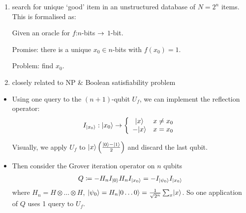 \documentclass[]{article}
\begin{document}
\begin{enumerate}[label=-]
	\item search for unique `good' item in an unstructured database of $N = 2^n$ items. This is formalised as:
	
	Given an oracle for $f$:$n$-bits $\rightarrow$ $1$-bit.

	Promise: there is a unique $x_0 \in n$-bits with $f(x_0) = 1$.

	Problem: find $x_0$.

	\item closely related to NP \& Boolean satisfiability problem
	
\end{enumerate}
\begin{itemize}
	\item Using one query to the $(n+1)$-qubit $U_f$, we can implement the reflection operator:
	\begin{align*}
		I_{\lvert x_0\rangle}:\lvert x_0\rangle \rightarrow \left\lbrace \begin{array}{cc} \lvert x\rangle & x\ne x_0 \\ -\lvert x\rangle & x = x_0 \end{array}\right.
	\end{align*}

	Visually, we apply $U_f$ to $\lvert x\rangle\left(\frac{\lvert0\rangle - \lvert1\rangle}{2}\right)$ and discard the last qubit.

	\item Then consider the Grover iteration operator on $n$ qubits
	\begin{align*}
		Q\coloneqq -H_nI_{\lvert0\rangle}H_nI_{\lvert x_0\rangle} = -I_{\lvert\psi_0\rangle}I_{\lvert x_0\rangle}
	\end{align*}
	where $H_n = H\otimes \dots\otimes H$, $\lvert\psi_0\rangle = H_n\lvert0\dots0\rangle = \frac{1}{\sqrt{2^n}}\sum_{x}\lvert x\rangle$. So one application of $Q$ uses 1 query to $U_f$.
\end{itemize}
\end{document}
